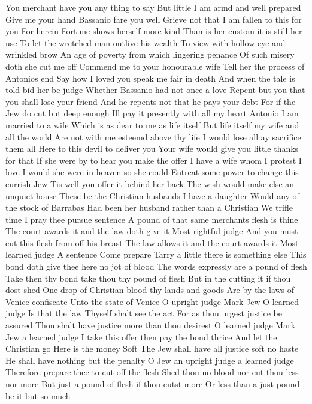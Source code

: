 You merchant have you any thing to say
But little I am armd and well prepared
Give me your hand Bassanio fare you well
Grieve not that I am fallen to this for you
For herein Fortune shows herself more kind
Than is her custom it is still her use
To let the wretched man outlive his wealth
To view with hollow eye and wrinkled brow
An age of poverty from which lingering penance
Of such misery doth she cut me off
Commend me to your honourable wife
Tell her the process of Antonios end
Say how I loved you speak me fair in death
And when the tale is told bid her be judge
Whether Bassanio had not once a love
Repent but you that you shall lose your friend
And he repents not that he pays your debt
For if the Jew do cut but deep enough
Ill pay it presently with all my heart
Antonio I am married to a wife
Which is as dear to me as life itself
But life itself my wife and all the world
Are not with me esteemd above thy life
I would lose all ay sacrifice them all
Here to this devil to deliver you
Your wife would give you little thanks for that
If she were by to hear you make the offer
I have a wife whom I protest I love
I would she were in heaven so she could
Entreat some power to change this currish Jew
Tis well you offer it behind her back
The wish would make else an unquiet house
These be the Christian husbands I have a daughter
Would any of the stock of Barrabas
Had been her husband rather than a Christian
We trifle time I pray thee pursue sentence
A pound of that same merchants flesh is thine
The court awards it and the law doth give it
Most rightful judge
And you must cut this flesh from off his breast
The law allows it and the court awards it
Most learned judge A sentence Come prepare
Tarry a little there is something else
This bond doth give thee here no jot of blood
The words expressly are a pound of flesh
Take then thy bond take thou thy pound of flesh
But in the cutting it if thou dost shed
One drop of Christian blood thy lands and goods
Are by the laws of Venice confiscate
Unto the state of Venice
O upright judge Mark Jew O learned judge
Is that the law
Thyself shalt see the act
For as thou urgest justice be assured
Thou shalt have justice more than thou desirest
O learned judge Mark Jew a learned judge
I take this offer then pay the bond thrice
And let the Christian go
Here is the money
Soft
The Jew shall have all justice soft no haste
He shall have nothing but the penalty
O Jew an upright judge a learned judge
Therefore prepare thee to cut off the flesh
Shed thou no blood nor cut thou less nor more
But just a pound of flesh if thou cutst more
Or less than a just pound be it but so much
